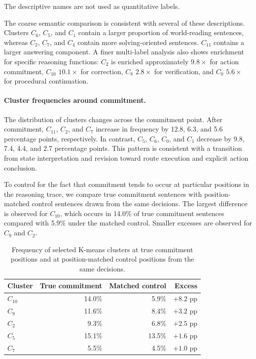 \documentclass{article}
\begin{document}
The descriptive names are not used as quantitative labels.

The coarse semantic comparison is consistent with several of these
descriptions. Clusters \(C_6\), \(C_5\), and \(C_1\) contain a larger
proportion of world-reading sentences, whereas \(C_2\), \(C_7\), and \(C_4\)
contain more solving-oriented sentences. \(C_{11}\) contains a larger
answering component. A finer multi-label analysis also shows enrichment for
specific reasoning functions: \(C_2\) is enriched approximately
\(9.8\times\) for action commitment, \(C_{10}\) \(10.1\times\) for
correction, \(C_8\) \(2.8\times\) for verification, and \(C_0\)
\(5.6\times\) for procedural continuation.

\paragraph{Cluster frequencies around commitment.}
The distribution of clusters changes across the commitment point. After
commitment, \(C_{11}\), \(C_2\), and \(C_7\) increase in frequency by
12.8, 6.3, and 5.6 percentage points, respectively. In contrast, \(C_5\),
\(C_6\), \(C_0\), and \(C_1\) decrease by 9.8, 7.4, 4.4, and 2.7 percentage
points. This pattern is consistent with a transition from state
interpretation and revision toward route execution and explicit action
conclusion.

To control for the fact that commitment tends to occur at particular
positions in the reasoning trace, we compare true commitment sentences with
position-matched control sentences drawn from the same decisions. The largest
difference is observed for \(C_{10}\), which occurs in 14.0\% of true
commitment sentences compared with 5.9\% under the matched control. Smaller
excesses are observed for \(C_9\) and \(C_2\).

\begin{table}[htbp]
\centering
\small
\begin{tabular}{lrrr}
\toprule
Cluster & True commitment & Matched control & Excess \\
\midrule
\(C_{10}\) & 14.0\% & 5.9\% & \(+8.2\) pp \\
\(C_9\)    & 11.6\% & 8.4\% & \(+3.2\) pp \\
\(C_2\)    & 9.3\% & 6.8\% & \(+2.5\) pp \\
\(C_5\)    & 15.1\% & 13.5\% & \(+1.6\) pp \\
\(C_7\)    & 5.5\% & 4.5\% & \(+1.0\) pp \\
\bottomrule
\end{tabular}
\caption{Frequency of selected K-means clusters at true commitment positions
and at position-matched control positions from the same decisions.}
\label{tab:commitment-clusters-app}
\end{table}
\end{document}
